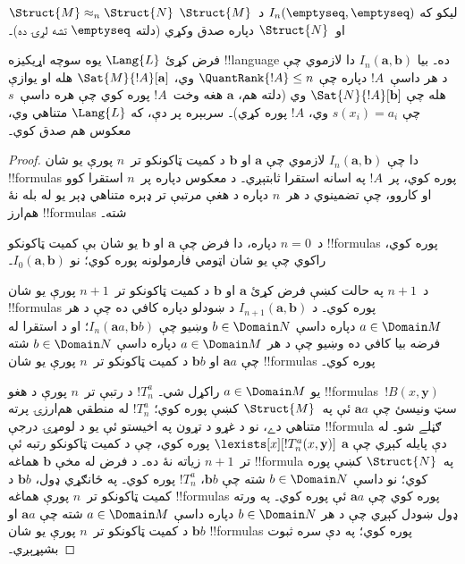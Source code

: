 \documentclass[../../../include/open-logic-section]{subfiles}
\begin{document}
\begin{defn}
  $\Struct{M} \approx_n \Struct{N}$ ليکو که
  $I_n(\emptyseq,\emptyseq)$ د~$\Struct{M}$ او~$\Struct{N}$ دپاره
  صدق وکړي (دلته $\emptyseq$ تشه لړۍ ده)۔
\end{defn}

\begin{thm}
  فرض کړئ $\Lang{L}$ يوه سوچه اړيکيزه !!{language} ده۔ بيا
  $I_n(\mathbf{a},\mathbf{b})$ دا لازموي چې د هر داسې~$!A$ دپاره چې
  $\QuantRank{!A} \le n$ وي، $\Sat{M}{!A}[\mathbf{a}]$ هله او يوازې
  هله چې $\Sat{N}{!A}[\mathbf{b}]$ وي (دلته هم، $\mathbf{a}$ هغه
  وخت~$!A$ پوره کوي چې هره داسې~$s$ چې $s(x_i) = a_i$ وي، $!A$ پوره
  کړي)۔ سربېره پر دې، که $\Lang{L}$ متناهي وي، معکوس هم صدق کوي۔
\end{thm}

\begin{proof}
  دا چې $I_n(\mathbf{a},\mathbf{b})$ لازموي چې $\mathbf{a}$ او
  $\mathbf{b}$ د کميت ټاکونکو تر~$n$ پورې يو شان !!{formula}s پوره
  کوي، پر~$!A$ په اسانه استقرا ثابتېږي۔ د معکوس دپاره پر~$n$ استقرا
  کوو او  کاروو، چې تضمينوي د هر~$n$ دپاره د
  هغې مرتبې تر ډېره متناهي ډېر يو له بله نۀ هم‌ارز !!{formula}s شته۔

  د~$n=0$ دپاره، دا فرض چې $\mathbf{a}$ او $\mathbf{b}$ يو شان بې
  کميت ټاکونکو !!{formula}s پوره کوي، راکوي چې يو شان اټومي فارمولونه
  پوره کوي؛ نو $I_0(\mathbf{a},\mathbf{b})$۔

  د~$n+1$ په حالت کښې فرض کړئ $\mathbf{a}$ او $\mathbf{b}$ د کميت
  ټاکونکو تر~$n+1$ پورې يو شان !!{formula}s پوره کوي۔ د
  $I_{n+1}(\mathbf{a},\mathbf{b})$ د ښودلو دپاره کافي ده چې د هر
  $a \in \Domain M$ دپاره داسې $b \in \Domain N$ وښيو چې
  $I_n(\mathbf{a}a,\mathbf{b}b)$؛ او د استقرا له فرضه بيا کافي ده
  وښيو چې د هر $a \in \Domain M$ دپاره داسې $b \in \Domain N$ شته
  چې $\mathbf{a}a$ او $\mathbf{b}b$ د کميت ټاکونکو تر~$n$ پورې يو
  شان !!{formula}s پوره کوي۔

  يو $a \in \Domain M$ راکړل شي۔ $!T^a_n$ د رتبې تر~$n$ پورې د هغو
  !!{formula}s~$!B(x,\mathbf{y})$ سټ ونيسئ چې $\mathbf{a}a$ ئې
  په~$\Struct{M}$ کښې پوره کوي؛ $!T^a_n$ له منطقي هم‌ارزۍ پرته
  متناهي دے، نو د غړو د تړون په اخيستو ئې يو د لومړۍ درجې
  !!{formula} ګڼلے شو۔ له دې پايله کېږي چې $\mathbf{a}$
  $\lexists[x][!T^a_n(x,\mathbf{y})]$ پوره کوي، چې د کميت ټاکونکو
  رتبه ئې تر~$n+1$ زياته نۀ ده۔ د فرض له مخې $\mathbf{b}$ هماغه
  !!{formula} په~$\Struct{N}$ کښې پوره کوي؛ نو داسې
  $b \in \Domain N$ شته چې $\mathbf{b}b$، $!T^a_n$ پوره کوي۔ په
  ځانګړي ډول، $\mathbf{b}b$ د کميت ټاکونکو تر~$n$ پورې هماغه
  !!{formula}s پوره کوي چې $\mathbf{a}a$ ئې پوره کوي۔ په ورته ډول
  ښودل کېږي چې د هر $b \in \Domain N$ دپاره داسې $a\in \Domain M$
  شته چې $\mathbf{a}a$ او $\mathbf{b}b$ د کميت ټاکونکو تر~$n$ پورې
  يو شان !!{formula}s پوره کوي؛ په دې سره ثبوت بشپړېږي۔
\end{proof}
\end{document}

